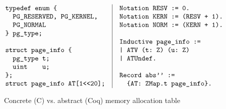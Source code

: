 \begin{figure}[t]\scriptsize
$$
\begin{array}{l|l}
\hspace*{-2ex}
\begin{array}[t]{l}
\verb+typedef enum {+\\
\verb+  PG_RESERVED, PG_KERNEL,+\\
\verb+  PG_NORMAL+\\
\verb+} pg_type;+\\
\\
\verb+struct page_info {+\\
\verb+  pg_type	t;+\\
\verb+  uint	u;+\\
\verb+};+\\
\verb+struct page_info AT[1<<20];+
\end{array}
&
\begin{array}[t]{l}
\verb+Notation RESV := 0.+\\
\verb"Notation KERN := (RESV + 1)."\\
\verb"Notation NORM := (KERN + 1)."\\
\\
\verb+Inductive page_info :=+\\
\verb+| ATV (t: Z) (u: Z)+\\ 
\verb+| ATUndef.+\\
\\
\verb+Record abs'' :=+\\
\verb+  {AT: ZMap.t page_info}.+\\
\end{array}
\end{array}
$$ 
\caption{Concrete (C) vs. abstract (Coq) memory allocation table}
\label{fig:alt}
\end{figure}

